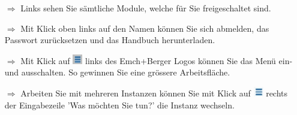 \documentclass{article}
\begin{document}
\begin{multicols}{2}

\begin{tcolorbox}[colback=blue!5,colframe=blue!40!black,title=Die Menüführung]
\begin{itemize}
  \item[$\Longrightarrow$] Links sehen Sie sämtliche Module, welche für Sie freigeschaltet sind.
  \item[$\Longrightarrow$] Mit Klick oben links auf den Namen können Sie sich abmelden, das Passwort zurücksetzen und das Handbuch herunterladen.
\end{itemize}
\begin{centering}
\end{centering}
\begin{itemize}
  \item[$\Longrightarrow$] Mit Klick auf \includegraphics[height=12pt]{Icons/Menu_Aus-Ein.jpg} links des Emch+Berger Logos können Sie das Menü ein- und ausschalten. So gewinnen Sie eine grössere Arbeitsfläche.
	\item[$\Longrightarrow$] Arbeiten Sie mit mehreren Instanzen können Sie mit Klick auf \includegraphics[height=12pt]{Icons/Instanz_wechseln.jpg} rechts der Eingabezeile 'Was möchten Sie tun?' die Instanz wechseln.
\end{itemize}
\end{tcolorbox}





\end{multicols}
\end{document}

